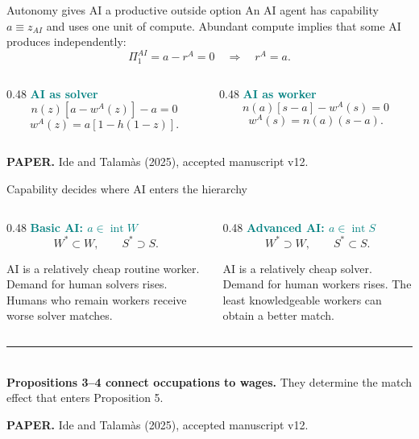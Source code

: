 \documentclass[aspectratio=169,11pt]{beamer}
\newcommand{\key}[1]{\textcolor{Teal}{\textbf{#1}}}
\newcommand{\sourcefoot}{\scriptsize\color{Muted}\textbf{PAPER.} Ide and Talam\`as (2025), accepted manuscript v12.}
\begin{document}
\begin{frame}{Autonomy gives AI a productive outside option}
\small
An AI agent has capability $a\equiv z_{AI}$ and uses one unit of compute.
Abundant compute implies that some AI produces independently:
\[
\Pi_1^{AI}=a-r^A=0
\quad\Longrightarrow\quad
\boxed{r^A=a}.
\]

\begin{columns}[T,totalwidth=\textwidth]
\begin{column}{0.48\textwidth}
  \key{AI as solver}
  \[
  n(z)[a-w^A(z)]-a=0
  \]
  \[
  \boxed{w^A(z)=a[1-h(1-z)]}.
  \]
\end{column}
\begin{column}{0.48\textwidth}
  \key{AI as worker}
  \[
  n(a)[s-a]-w^A(s)=0
  \]
  \[
  \boxed{w^A(s)=n(a)(s-a)}.
  \]
\end{column}
\end{columns}

\vfill
\sourcefoot
\end{frame}

\begin{frame}{Capability decides where AI enters the hierarchy}
\small
\begin{columns}[T,totalwidth=\textwidth]
\begin{column}{0.48\textwidth}
  \key{Basic AI: $a\in\operatorname{int}W$}
  \[
  W^*\subset W,
  \qquad S^*\supset S.
  \]

  AI is a relatively cheap routine worker. Demand for human solvers rises.
  Humans who remain workers receive worse solver matches.
\end{column}
\begin{column}{0.48\textwidth}
  \key{Advanced AI: $a\in\operatorname{int}S$}
  \[
  W^*\supset W,
  \qquad S^*\subset S.
  \]

  AI is a relatively cheap solver. Demand for human workers rises. The least
  knowledgeable workers can obtain a better match.
\end{column}
\end{columns}

\vfill
{\color{Teal}\rule{\textwidth}{0.8pt}}\\[-0.02cm]
\textbf{Propositions 3--4 connect occupations to wages.} They determine the
match effect that enters Proposition 5.

\vspace{0.08cm}
\sourcefoot
\end{frame}
\end{document}
